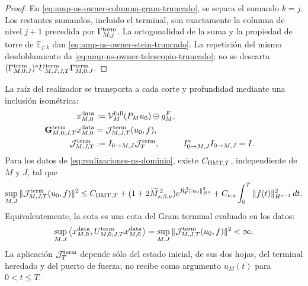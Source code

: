 \begin{proof}
En \eqref{eq:amp-ns-owner-columna-gram-truncado}, se separa el sumando
\(k=j\). Los restantes sumandos, incluido el terminal, son exactamente la
columna de nivel \(j+1\) precedida por
\(\Gamma_{M,j}^{\rm term}\). La ortogonalidad de la suma y la propiedad de
torre de \(\mathbb E_{j:k}\) dan
\eqref{eq:amp-ns-owner-stein-truncado}. La repetición del mismo
desdoblamiento da \eqref{eq:amp-ns-owner-telescopio-truncado}; no se
descarta
\((\Gamma_{M,0:J}^{\rm term})^*U_{M,J;J,T}^{\rm term}
\Gamma_{M,0:J}^{\rm term}\).
\end{proof}

\begin{theorem}
\label{thm:amp-ns-inyeccion-raiz-uniforme}
La raíz del realizador se transporta a cada corte y profundidad mediante
una inclusión isométrica:
\begin{equation}\label{eq:amp-ns-inyeccion-raiz-comun}
 \begin{aligned}
 x_{M,0}^{\rm data}
 &:=\mathcal V_M^{\rm full}(P_Mu_0)\oplus g_M^F,\\
 \mathbf G_{M,0;J,T}^{\rm term}x_{M,0}^{\rm data}
 &=\mathcal J_{M,J,T}^{\rm term}(u_0,f),\\
 \mathcal J_{M,J,T}^{\rm term}
 &:=I_{0\to M,J}\mathcal J_T^{\rm term},
 & I_{0\to M,J}^*I_{0\to M,J}&=I.
 \end{aligned}
\end{equation}
Para los datos de \eqref{eq:realizaciones-ns-dominio}, existe
\(C_{{\rm HMT},T}\), independiente de \(M\) y \(J\), tal que
\begin{equation}\label{eq:amp-ns-inyeccion-raiz-cota}
 \sup_{M,J}
 \|\mathcal J_{M,J,T}^{\rm term}(u_0,f)\|^2
 \leq C_{{\rm HMT},T}
 +(1+2\widetilde M_{s,\beta,\nu}^{\,2})
  e^{R_{\rm F}^{\,2}\|u_0\|_{H^s}^2}
 +C_{\nu,s}\int_0^T\|f(t)\|_{H^{s-1}}^2\,dt .
\end{equation}
Equivalentemente, la cota es una cota del Gram terminal evaluado en
los datos:
\begin{equation}\label{eq:amp-ns-owner-gram-cota-uniforme}
 \sup_{M,J}
 \left\langle x_{M,0}^{\rm data},
 U_{M,0;J,T}^{\rm term}x_{M,0}^{\rm data}\right\rangle
 =
 \sup_{M,J}
 \|\mathcal J_{M,J,T}^{\rm term}(u_0,f)\|^2
 <\infty .
\end{equation}
La aplicación \(\mathcal J_T^{\rm term}\) depende sólo del estado inicial,
de sus dos hojas, del terminal heredado y del puerto de fuerza; no recibe
como argumento \(u_M(t)\) para \(0<t\leq T\).
\end{theorem}

